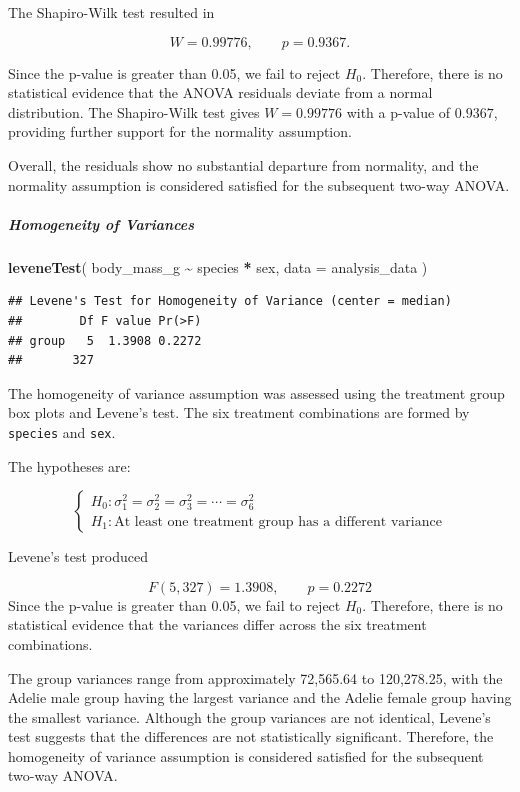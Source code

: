 \documentclass[
  11pt,
]{article}
\newenvironment{Shaded}{\begin{snugshade}}{\end{snugshade}}
\newcommand{\AttributeTok}[1]{\textcolor[rgb]{0.13,0.29,0.53}{#1}}
\newcommand{\FunctionTok}[1]{\textcolor[rgb]{0.13,0.29,0.53}{\textbf{#1}}}
\newcommand{\NormalTok}[1]{#1}
\newcommand{\SpecialCharTok}[1]{\textcolor[rgb]{0.81,0.36,0.00}{\textbf{#1}}}
\begin{document}
The Shapiro-Wilk test resulted in

\[
W = 0.99776,\qquad p = 0.9367.
\]

Since the p-value is greater than 0.05, we fail to reject \(H_0\).
Therefore, there is no statistical evidence that the ANOVA residuals
deviate from a normal distribution. The Shapiro-Wilk test gives
\(W=0.99776\) with a p-value of \(0.9367\), providing further support
for the normality assumption.

Overall, the residuals show no substantial departure from normality, and
the normality assumption is considered satisfied for the subsequent
two-way ANOVA.

\subparagraph{Homogeneity of Variances}\label{homogeneity-of-variances}

\begin{Shaded}
\begin{Highlighting}[]
\FunctionTok{leveneTest}\NormalTok{(}
\NormalTok{  body\_mass\_g }\SpecialCharTok{\textasciitilde{}}
\NormalTok{    species }\SpecialCharTok{*}\NormalTok{ sex,}
  \AttributeTok{data =}\NormalTok{ analysis\_data}
\NormalTok{)}
\end{Highlighting}
\end{Shaded}

\begin{verbatim}
## Levene's Test for Homogeneity of Variance (center = median)
##        Df F value Pr(>F)
## group   5  1.3908 0.2272
##       327
\end{verbatim}

The homogeneity of variance assumption was assessed using the treatment
group box plots and Levene's test. The six treatment combinations are
formed by \texttt{species} and \texttt{sex}.

The hypotheses are:

\[
\begin{cases}
H_0:
\sigma_1^2 = \sigma_2^2 = \sigma_3^2 = \cdots =\sigma_6^2\\
H_1:
\text{At least one treatment group has a different variance}
\end{cases}
\]

Levene's test produced

\[
F(5,327) = 1.3908,\qquad p = 0.2272
\] Since the p-value is greater than 0.05, we fail to reject \(H_0\).
Therefore, there is no statistical evidence that the variances differ
across the six treatment combinations.

The group variances range from approximately 72,565.64 to 120,278.25,
with the Adelie male group having the largest variance and the Adelie
female group having the smallest variance. Although the group variances
are not identical, Levene's test suggests that the differences are not
statistically significant. Therefore, the homogeneity of variance
assumption is considered satisfied for the subsequent two-way ANOVA.
\end{document}
